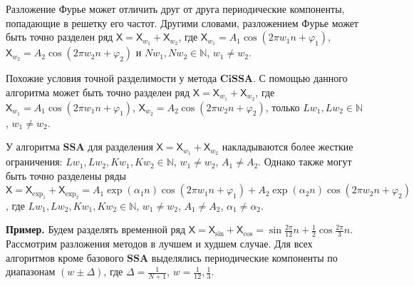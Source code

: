 \documentclass[a4paper, 11pt]{article}
\newcommand{\SSA}{\textbf{SSA}}
\newcommand{\CISSA}{\textbf{CiSSA}}
\newcommand{\TS}{\mathsf{X}}
\begin{document}
Разложение Фурье может отличить друг от друга периодические компоненты, попадающие в решетку его частот. Другими словами, разложением Фурье может быть точно разделен ряд $\TS = \TS_{w_1} + \TS_{w_2}$, где $\TS_{w_1} = A_1 \cos(2\pi w_1 n + \varphi_1)$, $\TS_{w_2} = A_2 \cos(2\pi w_2 n + \varphi_2)$ и $Nw_1, Nw_2 \in \mathbb{N}$, $w_1 \not = w_2$.

Похожие условия точной разделимости у метода $\CISSA$. С помощью данного алгоритма может быть точно разделен ряд $\TS = \TS_{w_1} + \TS_{w_2}$, где $\TS_{w_1} = A_1 \cos(2\pi w_1 n + \varphi_1)$, $\TS_{w_2} = A_2 \cos(2\pi w_2 n + \varphi_2)$, только $Lw_1, Lw_2 \in \mathbb{N}$, $w_1 \not = w_2$.

У алгоритма $\SSA$ для разделения $\TS = \TS_{w_1} + \TS_{w_2}$ накладываются более жесткие ограничения:  $Lw_1, Lw_2, Kw_1, Kw_2 \in \mathbb{N}$, $w_1 \not = w_2$, $A_1 \not = A_2$. Однако также могут быть точно разделены ряды $\TS = \TS_{\exp_1} + \TS_{\exp_2} = A_1 \exp(\alpha_1 n)\cos(2\pi w_1 n + \varphi_1) + A_2 \exp(\alpha_2 n)\cos(2\pi w_2 n + \varphi_2)$, где $Lw_1, Lw_2, Kw_1, Kw_2 \in \mathbb{N}$, $w_1 \not = w_2$, $A_1 \not = A_2$, $\alpha_1 \not = \alpha_2$.

\textbf{\large{Пример.}} Будем разделять временной ряд $\TS = \TS_{\sin} + \TS_{\cos} = \sin{\frac{2\pi}{12}n} + \frac{1}{2}\cos{\frac{2\pi}{3}n}$. Рассмотрим разложения методов в лучшем и худшем случае. Для всех алгоритмов кроме базового $\SSA$ выделялись периодические компоненты по диапазонам $\left(w \pm \Delta \right)$, где $\Delta = \frac{1}{N+1}$, $w = \frac{1}{12}, \frac{1}{3}$.
\end{document}
